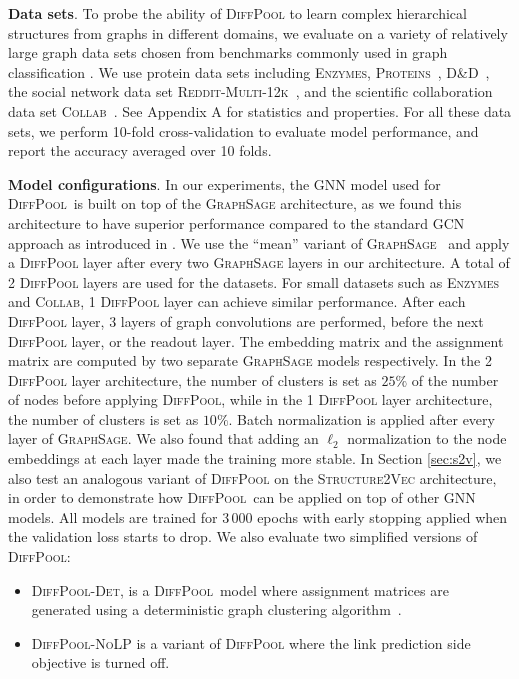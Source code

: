 \documentclass{article}
\newcommand{\xhdr}[1]{{\noindent\bfseries #1}.}
\newcommand{\name}{\textsc{DiffPool}\xspace}
\begin{document}
\xhdr{Data sets}
To probe the ability of \name to learn complex hierarchical structures from graphs in different domains, we evaluate on a variety of relatively large graph data sets chosen from benchmarks commonly used in graph classification \cite{KKMMN2016}. We use protein data sets including \textsc{Enzymes}, \textsc{Proteins}~\cite{Borgwardt2005a, Fer+2013}, \textsc{D\&D}~\cite{Dob+2003}, the social network data set \textsc{Reddit-Multi-12k}~\cite{Yan+2015a}, and the scientific collaboration data set \textsc{Collab}~\cite{Yan+2015a}. See Appendix A for statistics and properties.
For all these data sets, we perform 10-fold cross-validation to evaluate model performance, and report the accuracy averaged over 10 folds. 



\xhdr{Model configurations}
In our experiments, the GNN model used for \name\ is built on top of the \textsc{GraphSage} architecture, as we found this architecture to have superior performance compared to the standard GCN approach as introduced in \cite{kipf2017semi}. 
We use the ``mean'' variant of \textsc{GraphSage}~\cite{hamilton2017inductive} and apply a \name layer after every two \textsc{GraphSage} layers in our architecture.
A total of 2 \name layers are used for the datasets. For small datasets such as \textsc{Enzymes} and \textsc{Collab}, 1 \name layer can achieve similar performance.
After each \name layer, 3 layers of graph convolutions are performed, before the next \name layer, or the readout layer.
The embedding matrix and the assignment matrix are computed by two separate \textsc{GraphSage} models respectively.
In the 2 \name layer architecture, the number of clusters is set as $25\%$ of the number of nodes before applying \name,
while in the 1 \name layer architecture, the number of clusters is set as $10\%$.
Batch normalization \cite{ioffe2015batch} is applied after every layer of \textsc{GraphSage}. 
We also found that adding an $\ell_2$ normalization to the node embeddings at each layer made the training more stable. 
In Section \ref{sec:s2v}, we also test an analogous variant of \name on the \textsc{Structure2Vec} \cite{dai2016discriminative} architecture, in order to demonstrate how \name\ can be applied on top of other GNN models. 
All models are trained for 3\,000 epochs with early stopping applied when the validation loss starts to drop.
We also evaluate two simplified versions of \name:
\begin{itemize}[leftmargin=15pt, topsep=-5pt, parsep=0pt]
 \item \textsc{\name-Det}, is a \name\ model where assignment matrices are generated using a deterministic graph clustering algorithm~\cite{dhillon2007weighted}.\item
    \textsc{DiffPool-NoLP} is a variant of \textsc{\name} where the link prediction side objective is turned off.
\end{itemize}
\end{document}
